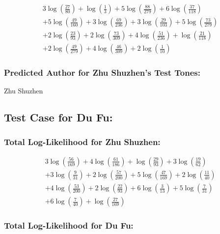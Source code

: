 \documentclass[12pt]{article}
\begin{document}
\begin{align*}
& 3 \log\left(\frac{27}{80}\right) + \log\left(\frac{1}{3}\right) + 5 \log\left(\frac{88}{279}\right) + 6 \log\left(\frac{37}{118}\right) \\
& + 5 \log\left(\frac{49}{160}\right) + 3 \log\left(\frac{69}{236}\right) + 3 \log\left(\frac{29}{103}\right) + 5 \log\left(\frac{73}{279}\right) \\
& + 2 \log\left(\frac{23}{93}\right) + 2 \log\left(\frac{73}{309}\right) + 4 \log\left(\frac{51}{236}\right) + \log\left(\frac{21}{118}\right) \\
& + 2 \log\left(\frac{49}{279}\right) + 4 \log\left(\frac{46}{309}\right) + 2 \log\left(\frac{1}{10}\right)
\end{align*}

\subsubsection*{Predicted Author for Zhu Shuzhen's Test Tones:}
Zhu Shuzhen

\subsection*{Test Case for Du Fu: }

\subsubsection*{Total Log-Likelihood for Zhu Shuzhen:}

\[
\begin{aligned}
    &3 \log\left(\frac{56}{169}\right) + 4 \log\left(\frac{61}{186}\right) + \log\left(\frac{29}{93}\right) + 3 \log\left(\frac{19}{62}\right) \\
    &+ 3 \log\left(\frac{9}{31}\right) + 2 \log\left(\frac{57}{200}\right) + 5 \log\left(\frac{47}{169}\right) + 2 \log\left(\frac{11}{40}\right) \\
    &+ 4 \log\left(\frac{53}{200}\right) + 2 \log\left(\frac{22}{93}\right) + 6 \log\left(\frac{3}{13}\right) + 5 \log\left(\frac{7}{31}\right) \\
    &+ 6 \log\left(\frac{7}{40}\right) + \log\left(\frac{27}{169}\right)
\end{aligned}
\]

\subsubsection*{Total Log-Likelihood for Du Fu:}
\end{document}
